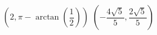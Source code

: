 { $\left( 2, \pi - \arctan\left(\dfrac{1}{2}\right)  \right)$ }
{ $\left( -\dfrac{4\sqrt{5}}{5}, \dfrac{2\sqrt{5}}{5} \right)$ }
